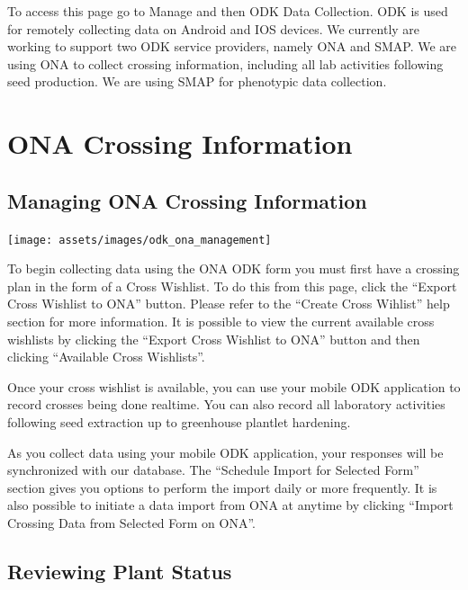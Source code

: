 \documentclass[
  12pt,
]{book}
\begin{document}
To access this page go to Manage and then ODK Data Collection. ODK is used for remotely collecting data on Android and IOS devices. We currently are working to support two ODK service providers, namely ONA and SMAP. We are using ONA to collect crossing information, including all lab activities following seed production. We are using SMAP for phenotypic data collection.

\hypertarget{ona-crossing-information}{%
\section{ONA Crossing Information}\label{ona-crossing-information}}

\hypertarget{managing-ona-crossing-information}{%
\subsection{Managing ONA Crossing Information}\label{managing-ona-crossing-information}}

\begin{center}\texttt{[image: assets/images/odk\_ona\_management]} \end{center}

To begin collecting data using the ONA ODK form you must first have a crossing plan in the form of a Cross Wishlist. To do this from this page, click the ``Export Cross Wishlist to ONA'' button. Please refer to the ``Create Cross Wihlist'' help section for more information. It is possible to view the current available cross wishlists by clicking the ``Export Cross Wishlist to ONA'' button and then clicking ``Available Cross Wishlists''.

Once your cross wishlist is available, you can use your mobile ODK application to record crosses being done realtime. You can also record all laboratory activities following seed extraction up to greenhouse plantlet hardening.

As you collect data using your mobile ODK application, your responses will be synchronized with our database. The ``Schedule Import for Selected Form'' section gives you options to perform the import daily or more frequently. It is also possible to initiate a data import from ONA at anytime by clicking ``Import Crossing Data from Selected Form on ONA''.

\hypertarget{reviewing-plant-status}{%
\subsection{Reviewing Plant Status}\label{reviewing-plant-status}}
\end{document}
